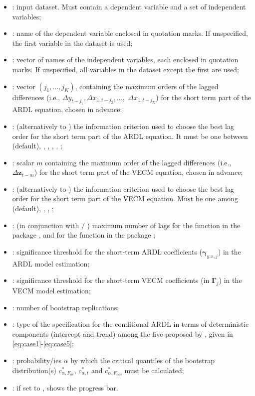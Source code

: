 \begin{itemize}
\item {}: input dataset. Must contain a dependent variable and a set of independent variables;
\item {}: name of the dependent variable enclosed in quotation marks. If unspecified, the first variable in the dataset is used;
\item {}: vector of names of the independent variables, each enclosed in quotation marks. If unspecified, all variables in the dataset except the first are used;
\item {}: vector $(j_1,\dots,j_K)$, containing the maximum orders of the lagged differences (i.e., $\Delta y_{t-j_1}, \Delta x_{1,t-j_2},\dots,$ $\Delta x_{1,t-j_K}$) for the short term part of the ARDL equation, chosen in advance; 
\item {}: (alternatively to ) the information criterion used to choose the best lag order for the short term part of the ARDL equation. It must be one between  (default), , , , , ; 
\item {}: scalar $m$ containing the maximum order of the lagged differences (i.e., $\Delta\mathbf z_{t-m}$) for the short term part of the VECM equation, chosen in advance; 
\item {}: (alternatively to ) the information criterion used to choose the best lag order for the short term part of the VECM equation. Must be one among  (default), , , ; 
\item {}: (in conjunction with  / ) maximum number of lags for the  function in the package , and for the  function in the package ;
\item {}: significance threshold for the short-term ARDL coefficients ($\boldsymbol\gamma_{y.x,j}$) in the ARDL model estimation; 
\item {}: significance threshold for the short-term VECM coefficients (in $\boldsymbol\Gamma_j$) in the VECM model estimation;
\item {}: number of bootstrap replications;
\item {}: type of the specification for the conditional ARDL in terms of deterministic components (intercept and trend) among the five proposed by \cite{pesaran2001}, given in \eqref{eq:case1}-\eqref{eq:case5};
\item {}: probability/ies $\alpha$ by which the critical quantiles of the bootstrap distribution(s) $c^{*}_{\alpha,F_{ov}}$, $c^{*}_{\alpha,t}$ and $c^{*}_{\alpha,F_{ind}}$ must be calculated;
\item {}: if set to , shows the progress bar.
\end{itemize}
